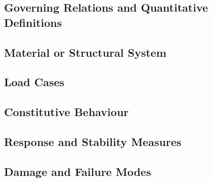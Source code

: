 %

\subsection{Governing Relations and Quantitative Definitions}
\label{sec:res-str-spec-governing-relations}

%

\subsection{Material or Structural System}
\label{sec:res-str-spec-material-structural-system}


\subsection{Load Cases}
\label{sec:res-str-spec-load-cases}


\subsection{Constitutive Behaviour}
\label{sec:res-str-spec-constitutive-behaviour}


\subsection{Response and Stability Measures}
\label{sec:res-str-spec-response-stability-measures}


\subsection{Damage and Failure Modes}
\label{sec:res-str-spec-damage-failure-modes}

